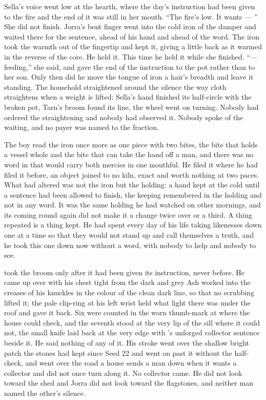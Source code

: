 \scenebreak

Sella's voice went low at the hearth, where the day's instruction had been given to the fire and the end of it was still in her mouth. “The fire's low. It wants --- ” She did not finish. Jorra's bent finger went into the cold iron of the damper and waited there for the sentence, ahead of his hand and ahead of the word. The iron took the warmth out of the fingertip and kept it, giving a little back as it warmed in the reverse of the core. He held it. This time he held it while she finished. “--- feeding,” she said, and gave the end of the instruction to the pot rather than to her son. Only then did he move the tongue of iron a hair's breadth and leave it standing. The household straightened around the silence the way cloth straightens when a weight is lifted: Sella's hand finished its half-circle with the broken pot, Tarn's broom found its line, the wheel went on turning. Nobody had ordered the straightening and nobody had observed it. Nobody spoke of the waiting, and no payer was named to the fraction.

The boy read the iron once more as one piece with two bites, the bite that holds a vessel whole and the bite that can take the hand off a man, and there was no word in  that would carry both mercies in one mouthful. He filed it where he had filed it before, an object joined to no kiln, exact and worth nothing at two paces. What had altered was not the iron but the holding: a hand kept at the cold until a sentence had been allowed to finish, the keeping remembered in the holding and not in any word. It was the same holding he had watched on other mornings, and its coming round again did not make it a change twice over or a third. A thing repeated is a thing kept. He had spent every day of his life taking likenesses down one at a time so that they would not stand up and call themselves a truth, and he took this one down now without a word, with nobody to help and nobody to see.

\scenebreak

 took the broom only after it had been given its instruction, never before. He came up over  with his chest tight from the dark and grey Ash worked into the creases of his knuckles in the colour of the clean dark line, so that no scrubbing lifted it; the pale clip-ring at his left wrist held what light there was under the roof and gave it back. Six were counted in the worn thumb-mark at  where the house could check, and the seventh stood at the very lip of the sill where it could not, the small knife laid back at the very edge with 's unforged collector sentence beside it. He said nothing of any of it. His stroke went over the shallow bright patch the stones had kept since Seed 22 and went on past it without the half-check, and went over the road a house sends a man down when it wants a collector and did not once turn along it. No collector came. He did not look toward the shed and Jorra did not look toward the flagstones, and neither man named the other's silence.

